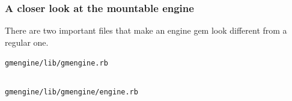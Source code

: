 \documentclass[compress]{beamer}
\begin{document}
\begin{frame}
\frametitle{A closer look at the mountable engine}

There are two important files that make an engine gem look different from a regular one.
\begin{itemize}
    \begin{item}
      \texttt{gmengine/lib/gmengine.rb}
      \inputminted[fontsize=\tiny,gobble=0,linenos=true,firstline=0,lastline=0]{ruby}{code/gmengine/lib/gmengine.rb}
    \end{item}
    \begin{item}
      \texttt{gmengine/lib/gmengine/engine.rb}
      \inputminted[fontsize=\tiny,gobble=0,linenos=true,firstline=0,lastline=0]{ruby}{code/gmengine/lib/gmengine/engine.rb}
    \end{item}
\end{itemize}
\end{frame}
\end{document}
